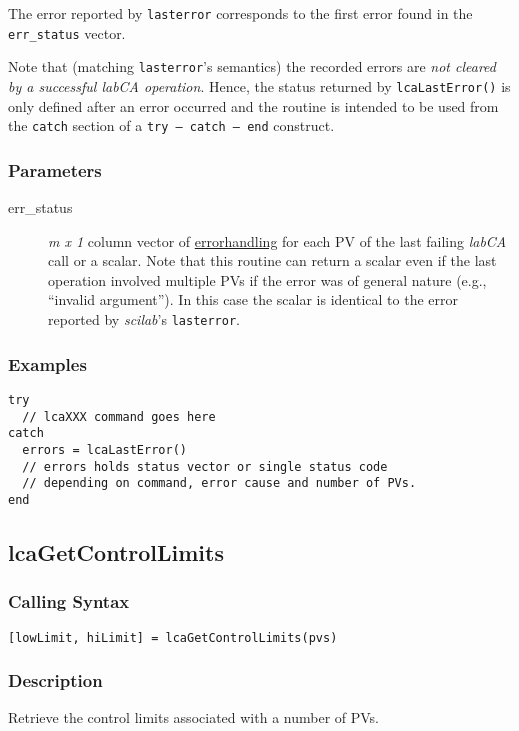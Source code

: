 \documentclass{article}
\newcommand{\sca}{\ita{labCA}}
\newcommand{\scilab}{\ita{scilab}}
\newcommand{\com}[1]{{\tt #1}}
\newcommand{\pbrkf}{\pagebreak}
\newcommand{\ita}[1]{\emph{#1}}
\newcommand{\mxl}{$m\times 1$}
\renewcommand{\mxl}{\ita{m x 1}}
\renewcommand{\pbrkf}{}
\begin{document}
The error reported by \com{lasterror} corresponds to the first error
found in the \com{err\_status} vector.

Note that (matching \com{lasterror}'s semantics) the recorded
errors are {\it not cleared by a successful \sca{} operation}.
Hence, the status returned by \com{lcaLastError()} is only defined
after an error occurred and the routine is intended to be used
from the \com{catch} section of a \mbox{\com{try -- catch -- end}}
construct.

\subsubsection{Parameters}
\begin{description}
\item[err\_status] \mxl{} column vector of
\hyperref{status codes}{(see~}{)}{errorhandling}
for each PV of the last failing \sca{} call or a scalar.
Note that this routine can return a scalar even if
the last operation involved multiple PVs if the
error was of general nature (e.g., ``invalid argument'').
In this case the scalar is identical to the error reported
by \scilab{}'s \com{lasterror}.
\end{description}
\subsubsection{Examples}
\begin{verbatim}
try
  // lcaXXX command goes here
catch
  errors = lcaLastError()
  // errors holds status vector or single status code
  // depending on command, error cause and number of PVs.
end
\end{verbatim}

\vspace*{\fill}
\pbrkf
\subsection{lcaGetControlLimits}
\subsubsection{Calling Syntax}
\begin{verbatim}
[lowLimit, hiLimit] = lcaGetControlLimits(pvs)
\end{verbatim}
\subsubsection{Description}
Retrieve the control limits associated with a number of PVs.
\end{document}
